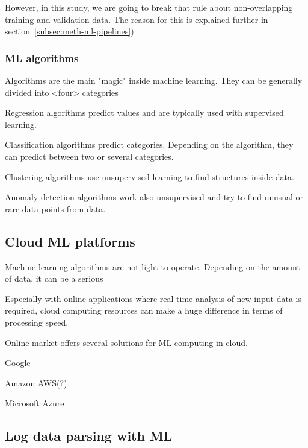 However, in this study,
we are going to break that rule
about non-overlapping training and validation data.
The reason for this is explained further in section~\ref{subsec:meth-ml-pipelines})

\subsubsection*{ML algorithms}
Algorithms are the main "magic" inside machine learning. %
They can be generally divided into <four> categories %

Regression algorithms predict values
and are typically used with supervised learning.

Classification algorithms predict categories.
Depending on the algorithm,
they can predict between two or several categories.

Clustering algorithms use unsupervised learning
to find structures inside data.

Anomaly detection algorithms work also unsupervised
and try to find unusual or rare data points from data.


\subsection{Cloud ML platforms}\label{subsec:bg-cloud-ml-platforms}

Machine learning algorithms are not light to operate.
Depending on the amount of data,
it can be a serious %

Especially with online applications
where real time analysis of new input data is required,
cloud computing resources can make a huge difference
in terms of processing speed. %

Online market offers several solutions for ML computing in cloud.

Google

Amazon AWS(?)

Microsoft Azure\cite{altexsoft}




\subsection{Log data parsing with ML}\label{subsec:bg-log-data-parsing-with-ml}

